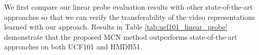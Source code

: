 \documentclass[10pt,twocolumn,letterpaper]{article}
\begin{document}
We first compare our linear probe evaluation results with other state-of-the-art approaches so that we can verify the transferability of the video representations learned with our approach. Results in Table \ref{tab:ucf101_linear_probe} demonstrate that the proposed MCN method outperforms state-of-the-art approaches on both UCF101 and HMDB51. 

\begin{table}[htbp]
		\centering
{}
		\vspace{0.25cm}
		\caption{Linear probe comparisons with state-of-the-art methods on UCF101 and HMDB51 datasets.}
		\label{tab:ucf101_linear_probe}
	\end{table}
	
\end{document}
